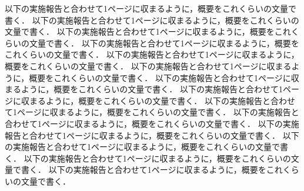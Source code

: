 以下の実施報告と合わせて1ページに収まるように，概要をこれくらいの文量で書く．
以下の実施報告と合わせて1ページに収まるように，概要をこれくらいの文量で書く．
以下の実施報告と合わせて1ページに収まるように，概要をこれくらいの文量で書く．
以下の実施報告と合わせて1ページに収まるように，概要をこれくらいの文量で書く．
以下の実施報告と合わせて1ページに収まるように，概要をこれくらいの文量で書く．
以下の実施報告と合わせて1ページに収まるように，概要をこれくらいの文量で書く．
以下の実施報告と合わせて1ページに収まるように，概要をこれくらいの文量で書く．
以下の実施報告と合わせて1ページに収まるように，概要をこれくらいの文量で書く．
以下の実施報告と合わせて1ページに収まるように，概要をこれくらいの文量で書く．
以下の実施報告と合わせて1ページに収まるように，概要をこれくらいの文量で書く．
以下の実施報告と合わせて1ページに収まるように，概要をこれくらいの文量で書く．
以下の実施報告と合わせて1ページに収まるように，概要をこれくらいの文量で書く．
以下の実施報告と合わせて1ページに収まるように，概要をこれくらいの文量で書く．
以下の実施報告と合わせて1ページに収まるように，概要をこれくらいの文量で書く．

